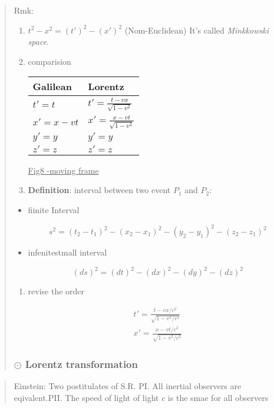 \documentclass[12pt]{article}
\begin{document}
\begin{quote}
	Rmk:
\begin{enumerate}
	\item $t^2-x^2 = (t')^2 - (x')^2$ (Nom-Euclidean) It's called \textit{Minkkowski space}.

	\item comparision

\begin{table}[htbp]
\centering
\begin{tabular}{ll}
\hline
Galilean & Lorentz \\ \hline
$t'=t$ & $t'=\frac{t-vx}{\sqrt{1-v^2}}$ \\
$x'=x-vt$ & $x'=\frac{x-vt}{\sqrt{1-v^2}}$ \\
$y'=y$ & $y'=y$ \\
$z'=z$ & $z'= z$ \\
\hline
\end{tabular}
\end{table}
\underline{Fig8 -moving frame}
	\item \textbf{Definition}: interval between two event $P_1$ and $P_2$:


\end{enumerate}
\begin{itemize}
	\item fiinite Interval


\begin{equation}
s^2 = (t_2-t_1)^2 - (x_2-x_1)^2 - (y_2-y_1)^2 - (z_2-z_1)^2
\end{equation}

	\item infenitestmall interval

\begin{equation}
(ds)^2 = (dt)^2 - (dx)^2 - (dy)^2 - (dz)^2
\end{equation}


\end{itemize}
\begin{enumerate}
	\item revise the order

\begin{equation}
\begin{aligned}
t' = \frac{t-vx/c^2}{\sqrt{1-v^2/c^2}}\\
x' = \frac{x-vt/c^2}{\sqrt{1-v^2/c^2}}
\end{aligned}
\end{equation}

\end{enumerate}
\subsubsection{$\odot$ \textbf{Lorentz transformation}} %

\end{quote}
\begin{quote}
	Einstein: Two postitulates of S.R.
PI. All inertial observers are eqivalent.PII. The speed of light of light $c$ is the smae for all observers
\end{quote}
\end{document}
